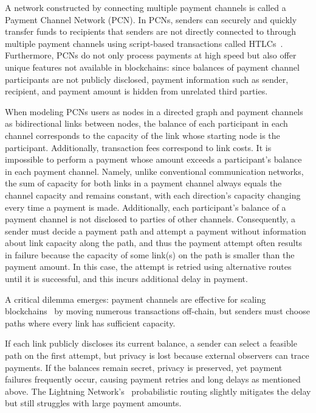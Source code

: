 \documentclass[conference]{IEEEtran}
\begin{document}
A network constructed by connecting multiple payment channels is called a Payment Channel Network (PCN).
In PCNs, senders can securely and quickly transfer funds to recipients that senders are not directly connected to through multiple payment channels using script-based transactions called HTLCs~\cite{poon_dryja_2016}.
Furthermore, PCNs do not only process payments at high speed but also offer unique features not available in blockchains: since balances of payment channel participants are not publicly disclosed, payment information such as sender, recipient, and payment amount is hidden from unrelated third parties.

When modeling PCNs users as nodes in a directed graph and payment channels as bidirectional links between nodes, the balance of each participant in each channel corresponds to the capacity of the link whose starting node is the participant.
Additionally, transaction fees correspond to link costs.
It is impossible to perform a payment whose amount exceeds a participant's balance in each payment channel.
Namely, unlike conventional communication networks, the sum of capacity for both links in a payment channel always equals the channel capacity and remains constant, with each direction's capacity changing every time a payment is made.
Additionally, each participant's balance of a payment channel is not disclosed to parties of other channels.
Consequently, a sender must decide a payment path and attempt a payment without information about link capacity along the path, and thus the payment attempt often results in failure because the capacity of some link(s) on the path is smaller than the payment amount. In this case, the attempt is retried using alternative routes until it is successful, and this incurs additional delay in payment.

A critical dilemma emerges: payment channels are effective for scaling blockchains~\cite{poon_dryja_2016} by moving numerous transactions off-chain, but senders must choose paths where every link has sufficient capacity.

If each link publicly discloses its current balance, a sender can select a feasible path on the first attempt, but privacy is lost because external observers can trace payments.
If the balances remain secret, privacy is preserved, yet payment failures frequently occur, causing payment retries and long delays as mentioned above.
The Lightning Network's~\cite{lnbolt} probabilistic routing slightly mitigates the delay but still struggles with large payment amounts.
\end{document}
